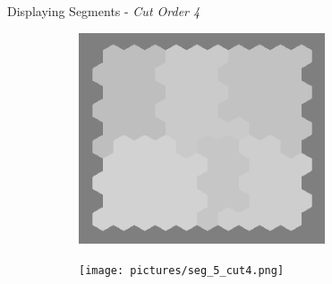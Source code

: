 \documentclass[10pt,xcolor=svgnames]{beamer} %
\begin{document}
\begin{frame}[standout]{Displaying Segments - \textit{Cut Order 4}}
    \begin{figure}
        \centering
        \begin{subfigure}{0.4\textwidth}
        \centering
            \includegraphics[width=0.8\textwidth]{pictures/grid_init4.png}
        \end{subfigure}
        \hfill
        \begin{subfigure}{0.4\textwidth}
            \centering
            \texttt{[image: pictures/seg\_5\_cut4.png]}
        \end{subfigure}
    \end{figure}
\end{frame}

\end{document}
